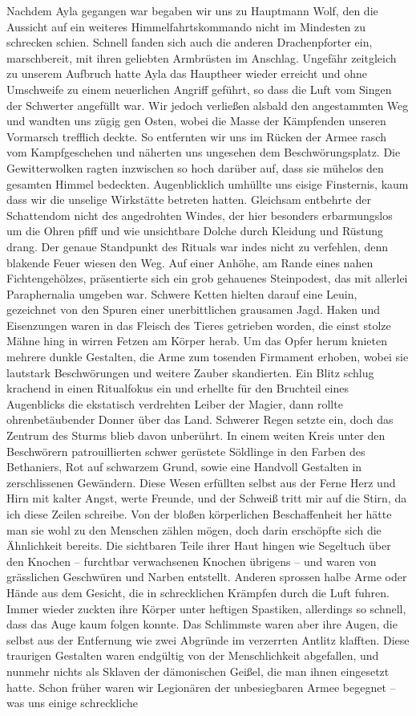 Nachdem Ayla gegangen war begaben wir uns zu Hauptmann Wolf, den die Aussicht auf ein weiteres Himmelfahrtskommando nicht im Mindesten zu schrecken schien. Schnell fanden sich auch die anderen Drachenpforter ein, marschbereit, mit ihren geliebten Armbrüsten im Anschlag. Ungefähr zeitgleich zu unserem Aufbruch hatte Ayla das Hauptheer wieder erreicht und ohne Umschweife zu einem neuerlichen Angriff geführt, so dass die Luft vom Singen der Schwerter angefüllt war. Wir jedoch verließen alsbald den angestammten Weg und wandten uns zügig gen Osten, wobei die Masse der Kämpfenden unseren Vormarsch trefflich deckte. So entfernten wir uns im Rücken der Armee rasch vom Kampfgeschehen und näherten uns ungesehen dem Beschwörungsplatz. Die Gewitterwolken ragten inzwischen so hoch darüber auf, dass sie mühelos den gesamten Himmel bedeckten. Augenblicklich umhüllte uns eisige Finsternis, kaum dass wir die unselige Wirkstätte betreten hatten. Gleichsam entbehrte der Schattendom nicht des angedrohten Windes, der hier besonders erbarmungslos um die Ohren pfiff und wie unsichtbare Dolche durch Kleidung und Rüstung drang. Der genaue Standpunkt des Rituals war indes nicht zu verfehlen, denn blakende Feuer wiesen den Weg. Auf einer Anhöhe, am Rande eines nahen Fichtengehölzes, präsentierte sich ein grob gehauenes Steinpodest, das mit allerlei Paraphernalia umgeben war. Schwere Ketten hielten darauf eine Leuin, gezeichnet von den Spuren einer unerbittlichen grausamen Jagd. Haken und Eisenzungen waren in das Fleisch des Tieres getrieben worden, die einst stolze Mähne hing in wirren Fetzen am Körper herab. Um das Opfer herum knieten mehrere dunkle Gestalten, die Arme zum tosenden Firmament erhoben, wobei sie lautstark Beschwörungen und weitere Zauber skandierten. Ein Blitz schlug krachend in einen Ritualfokus ein und erhellte für den Bruchteil eines Augenblicks die ekstatisch verdrehten Leiber der Magier, dann rollte ohrenbetäubender Donner über das Land. Schwerer Regen setzte ein, doch das Zentrum des Sturms blieb davon unberührt. In einem weiten Kreis unter den Beschwörern patrouillierten schwer gerüstete Söldlinge in den Farben des Bethaniers, Rot auf schwarzem Grund, sowie eine Handvoll Gestalten in zerschlissenen Gewändern. Diese Wesen erfüllten selbst aus der Ferne Herz und Hirn mit kalter Angst, werte Freunde, und der Schweiß tritt mir auf die Stirn, da ich diese Zeilen schreibe. Von der bloßen körperlichen Beschaffenheit her hätte man sie wohl zu den Menschen zählen mögen, doch darin erschöpfte sich die Ähnlichkeit bereits. Die sichtbaren Teile ihrer Haut hingen wie Segeltuch über den Knochen -- furchtbar verwachsenen Knochen übrigens -- und waren von grässlichen Geschwüren und Narben entstellt. Anderen sprossen halbe Arme oder Hände aus dem Gesicht, die in schrecklichen Krämpfen durch die Luft fuhren. Immer wieder zuckten ihre Körper unter heftigen Spastiken, allerdings so schnell, dass das Auge kaum folgen konnte. Das Schlimmste waren aber ihre Augen, die selbst aus der Entfernung wie zwei Abgründe im verzerrten Antlitz klafften. Diese traurigen Gestalten waren endgültig von der Menschlichkeit abgefallen, und nunmehr nichts als Sklaven der dämonischen Geißel, die man ihnen eingesetzt hatte. Schon früher waren wir Legionären der unbesiegbaren Armee begegnet -- was uns einige schreckliche 